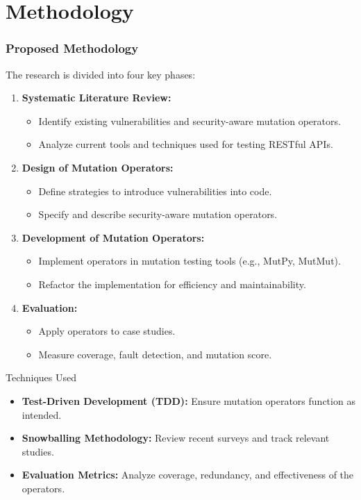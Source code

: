 \documentclass[12pt]{beamer}
\theoremstyle{remark}
\theoremstyle{definition}
\begin{document}
\section{Methodology}
\begin{frame}[allowframebreaks]
\frametitle{Proposed Methodology}
The research is divided into four key phases:
\begin{enumerate}
    \item \textbf{Systematic Literature Review:} 
    \begin{itemize}
        \item Identify existing vulnerabilities and security-aware mutation operators.
        \item Analyze current tools and techniques used for testing RESTful APIs.
    \end{itemize}
    \item \textbf{Design of Mutation Operators:} 
    \begin{itemize}
        \item Define strategies to introduce vulnerabilities into code.
        \item Specify and describe security-aware mutation operators.
    \end{itemize}
    \item \textbf{Development of Mutation Operators:} 
    \begin{itemize}
        \item Implement operators in mutation testing tools (e.g., MutPy, MutMut).
        \item Refactor the implementation for efficiency and maintainability.
    \end{itemize}
    \item \textbf{Evaluation:} 
    \begin{itemize}
        \item Apply operators to case studies.
        \item Measure coverage, fault detection, and mutation score.
    \end{itemize}
\end{enumerate}

\begin{block}{Techniques Used}
\begin{itemize}
    \item \textbf{Test-Driven Development (TDD):} Ensure mutation operators function as intended.
    \item \textbf{Snowballing Methodology:} Review recent surveys and track relevant studies.
    \item \textbf{Evaluation Metrics:} Analyze coverage, redundancy, and effectiveness of the operators.
\end{itemize}
\end{block}


\end{frame}
\end{document}
